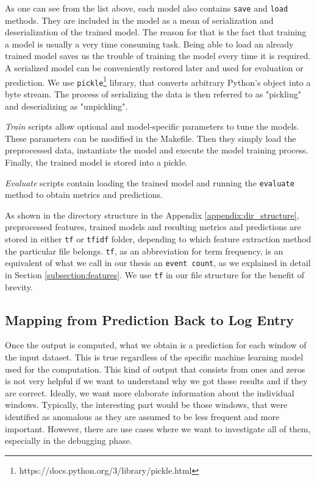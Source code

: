 As one can see from the list above, each model also contains \texttt{save} and \texttt{load} methods. They are included in the model as a mean of serialization and deserialization of the trained model. The reason for that is the fact that training a model is usually a very time consuming task. Being able to load an already trained model saves us the trouble of training the model every time it is required. A serialized model can be conveniently restored later and used for evaluation or prediction. We use \texttt{pickle}\footnote{https://docs.python.org/3/library/pickle.html} library, that converts arbitrary Python's object into a byte stream. The process of serializing the data is then referred to as "pickling" and deserializing as "unpickling".

\textit{Train} scripts allow optional and model-specific parameters to tune the models. These parameters can be modified in the Makefile. Then they simply load the preprocessed data, instantiate the model and execute the model training process. Finally, the trained model is stored into a pickle. 
 
\textit{Evaluate} scripts contain loading the trained model and running the \texttt{\justify evaluate} method to obtain metrics and predictions.

As shown in the directory structure in the Appendix \ref{appendix:dir_structure}, preprocessed features, trained models and resulting metrics and predictions are stored in either \texttt{tf} or \texttt{tfidf} folder, depending to which feature extraction method the particular file belongs. \texttt{tf}, as an abbreviation for term frequency, is an equivalent of what we call in our thesis an \texttt{event count}, as we explained in detail in Section \ref{subsection:features}. We use \texttt{tf} in our file structure for the benefit of brevity.

\subsection{Mapping from Prediction Back to Log Entry}
Once the output is computed, what we obtain is a prediction for each window of the input dataset. This is true regardless of the specific machine learning model used for the computation. 
This kind of output that consists from ones and zeros is not very helpful if we want to understand why we got those results and if they are correct. Ideally, we want more elaborate information about the individual windows.
Typically, the interesting part would be those windows, that were identified as anomalous as they are assumed to be less frequent and more important. However, there are use cases where we want to investigate all of them, especially in the debugging phase. 

